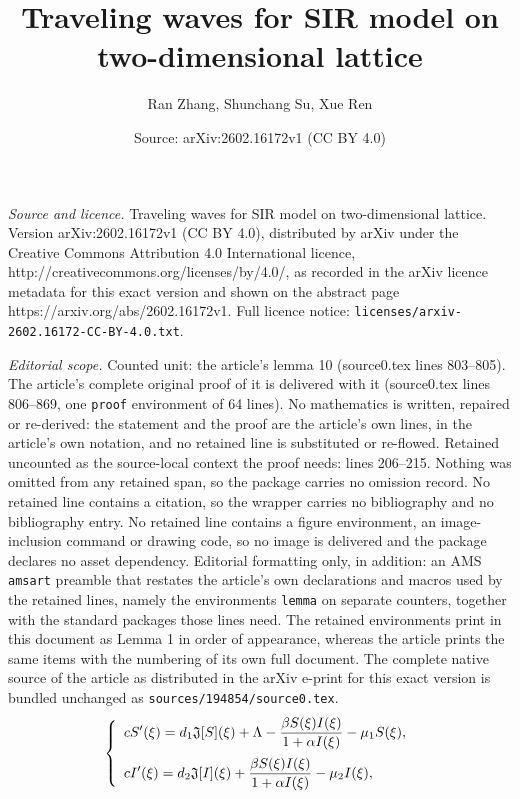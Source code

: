 \documentclass[10pt,a4paper]{amsart}
\title{Traveling waves for SIR model on two-dimensional lattice}
\author{Ran Zhang, Shunchang Su, Xue Ren}
\date{Source: arXiv:2602.16172v1 (CC BY 4.0)}
\begin{document}
\maketitle

\noindent\emph{Source and licence.} Traveling waves for SIR model on two-dimensional lattice. Version arXiv:2602.16172v1 (CC BY 4.0), distributed by arXiv under the Creative Commons Attribution 4.0 International licence, http://creativecommons.org/licenses/by/4.0/, as recorded in the arXiv licence metadata for this exact version and shown on the abstract page https://arxiv.org/abs/2602.16172v1. Full licence notice: \texttt{licenses/arxiv-2602.16172-CC-BY-4.0.txt}.\par\smallskip

\noindent\textit{Editorial scope.} Counted unit: the article's lemma 10 (source0.tex lines 803--805). The article's complete original proof of it is delivered with it (source0.tex lines 806--869, one \texttt{proof} environment of 64 lines). No mathematics is written, repaired or re-derived: the statement and the proof are the article's own lines, in the article's own notation, and no retained line is substituted or re-flowed.  Retained uncounted as the source-local context the proof needs: lines 206--215.  Nothing was omitted from any retained span, so the package carries no omission record.  No retained line contains a citation, so the wrapper carries no bibliography and no bibliography entry.  No retained line contains a figure environment, an image-inclusion command or drawing code, so no image is delivered and the package declares no asset dependency.  Editorial formatting only, in addition: an AMS \texttt{amsart} preamble that restates the article's own declarations and macros used by the retained lines, namely the environments \texttt{lemma} on separate counters, together with the standard packages those lines need.  The retained environments print in this document as Lemma 1 in order of appearance, whereas the article prints the same items with the numbering of its own full document.  The complete native source of the article as distributed in the arXiv e-print for this exact version is bundled unchanged as \texttt{sources/194854/source0.tex}.
\begin{equation}
\label{WaveEqu}\left\{
\begin{array}{l}
\vspace{2mm}
\displaystyle   c S'(\xi) =
d_1\mathfrak{J}[S](\xi) + \Lambda - \frac{\beta S(\xi)I(\xi)}{1+\alpha I(\xi)} - \mu_1 S(\xi),\\
\displaystyle   c I'(\xi) =
d_2\mathfrak{J}[I](\xi) + \frac{\beta S(\xi)I(\xi)}{1+\alpha I(\xi)} - \mu_2 I(\xi),
\end{array}\right.
\end{equation}
\end{document}
